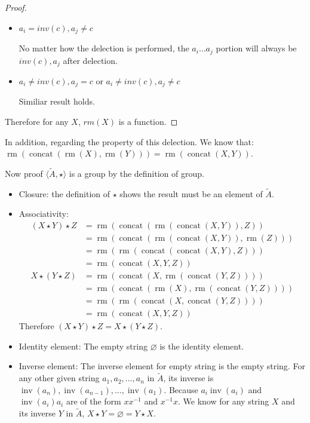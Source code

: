 \documentclass[11pt]{article}
\begin{document}
\begin{proof}
\begin{itemize}
  \item{$a_i = inv(c), a_j \neq c$}

    No matter how the delection is performed, the $a_i\ldots a_j$ portion will
    always be $inv(c),a_j$ after delection.

  \item{$a_i \neq inv(c), a_j = c$ or $a_i \neq inv(c), a_j \neq c$}

    Similiar result holds.
\end{itemize}

Therefore for any $X$, $rm(X)$ is a function.
\end{proof}

In addition, regarding the property of this delection. We know that:
 $\mathop{rm}(\mathop{concat}(\mathop{rm}(X),\mathop{rm}(Y)))
=\mathop{rm}(\mathop{concat}(X,Y))$.

Now proof $\langle \tilde{A}, \star \rangle$ is a group by the definition of group.

\begin{itemize}
  \item{Closure}: the definition of $\star$ shows the result must be
    an element of $\tilde{A}$.
  \item{Associativity}:
    \begin{align*}
      (X \star Y) \star Z
      & = \mathop{rm}(\mathop{concat}(\mathop{rm}({\mathop{concat}}(X,Y)),Z)) \\
      & = \mathop{rm}(\mathop{concat}(\mathop{rm}({\mathop{concat}}(X,Y)),\mathop{rm}(Z))) \\
      & = \mathop{rm}(\mathop{rm}(\mathop{concat}(\mathop{concat}(X,Y),Z))) \\
      & = \mathop{rm}(\mathop{concat}(X,Y,Z)) \\
      X \star (Y \star Z)
      & = \mathop{rm}(\mathop{concat}(X,\mathop{rm}({\mathop{concat}}(Y,Z)))) \\
      & = \mathop{rm}(\mathop{concat}(\mathop{rm}(X),\mathop{rm}({\mathop{concat}}(Y,Z)))) \\
      & = \mathop{rm}(\mathop{rm}(\mathop{concat}(X,\mathop{concat}(Y,Z)))) \\
      & = \mathop{rm}(\mathop{concat}(X,Y,Z))
    \end{align*}
    Therefore $(X \star Y) \star Z = X \star (Y \star Z)$.
  \item{Identity element}:
    The empty string $\varnothing$ is the identity element.
  \item{Inverse element}:
    The inverse element for empty string is the empty string.
    For any other given string $a_1,a_2,\ldots,a_n$ in $\tilde{A}$,
    its inverse is $\mathop{inv}(a_n),\mathop{inv}(a_{n-1}),\ldots,\mathop{inv}(a_1)$.
    Because $a_i\mathop{inv}(a_i)$ and $\mathop{inv}(a_i)a_i$ are of the form
    $xx^{-1}$ and $x^{-1}x$. We know for any string $X$ and its inverse $Y$ in $\tilde{A}$,
    $X \star Y = \varnothing = Y \star X$.
\end{itemize}
\end{document}
